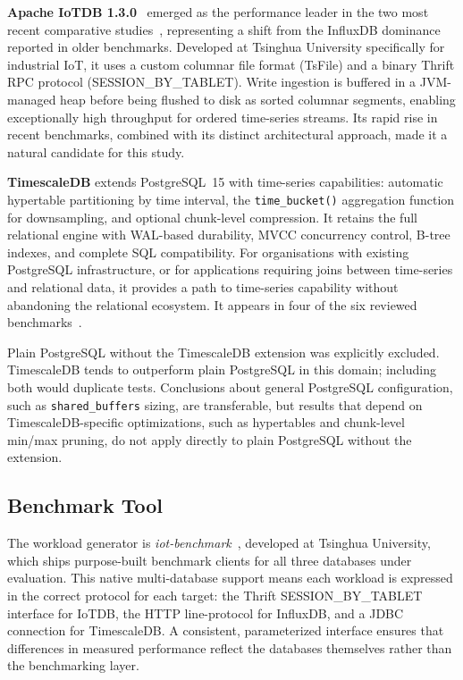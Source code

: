 \textbf{Apache IoTDB 1.3.0}~\cite{wang2023iotdb} emerged as the performance leader in
the two most recent comparative studies~\citep{pereira2023mulletbench,wang2023iotdb},
representing a shift from the InfluxDB dominance reported in older benchmarks.
Developed at Tsinghua University specifically for industrial IoT, it uses a custom columnar
file format (TsFile) and a binary Thrift RPC protocol (SESSION\_BY\_TABLET). Write ingestion
is buffered in a JVM-managed heap before being flushed to disk as sorted columnar segments,
enabling exceptionally high throughput for ordered time-series streams. Its rapid rise in
recent benchmarks, combined with its distinct architectural approach, made it a natural
candidate for this study.

\textbf{TimescaleDB} extends PostgreSQL~15 with time-series capabilities: automatic
hypertable partitioning by time interval, the \texttt{time\_bucket()} aggregation function
for downsampling, and optional chunk-level compression. It retains the full relational engine
with WAL-based durability, MVCC concurrency control, B-tree indexes, and complete SQL
compatibility. For organisations with existing PostgreSQL infrastructure, or for applications
requiring joins between time-series and relational data, it provides a path to time-series
capability without abandoning the relational ecosystem. It appears in four of the six
reviewed benchmarks~\citep{shah2022performance,lima2024avaliando,wang2023iotdb,grzesik2020comparative}.

Plain PostgreSQL without the TimescaleDB extension was explicitly excluded. TimescaleDB
tends to outperform plain PostgreSQL in this domain; including both would duplicate tests.
Conclusions about general PostgreSQL configuration, such as \texttt{shared\_buffers}
sizing, are transferable, but results that depend on TimescaleDB-specific optimizations,
such as hypertables and chunk-level min/max pruning, do not apply directly to plain
PostgreSQL without the extension.

\subsection{Benchmark Tool}
\label{sec:benchmark-tool}

The workload generator is \textit{iot-benchmark}~\cite{iotbenchmark}, developed at Tsinghua
University, which ships purpose-built benchmark clients for all three databases under evaluation.
This native multi-database support means each workload is expressed in the correct protocol
for each target: the Thrift SESSION\_BY\_TABLET interface for IoTDB, the HTTP line-protocol
for InfluxDB, and a JDBC connection for TimescaleDB. A consistent, parameterized interface
ensures that differences in measured performance reflect the databases themselves rather
than the benchmarking layer.

